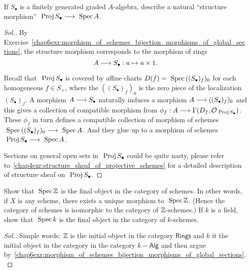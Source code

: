 \documentclass[11pt]{book} %
\begin{document}
\begin{exr}
If $S_\bullet$ is a finitely generated graded $A$-algebra, describe a natural ``structure morphism'' $\text{ Proj\,} S_\bullet\longrightarrow \text{ Spec\,} A$.
\end{exr}
\begin{proof}[Sol.]
By Exercise~\ref{chap6exr:morphism_of_schemes_bijection_morphisms_of_global_sections}, the structure morphism corresponds to the morphism of rings
$$
A\longrightarrow S_\bullet : a\mapsto a\times 1.
$$

Recall that $\text{ Proj\,} S_\bullet$ is covered by  affine charts $D(f)=\text{ Spec\,} ((S_\bullet)_f)_0$ for each homogeneous $f\in S_+$, where the $((S_\bullet)_f)_0$ is the zero piece of the localization $(S_\bullet)_f$. A morphism $A\longrightarrow S_\bullet$ naturally induces a morphism $A\longrightarrow ((S_\bullet)_f)_0$ and this gives a collection of compatible morphism from $\phi_f:A\longrightarrow \Gamma(D_f, {\cal O}_{\text{ Proj\,} S_\bullet})$. These $\phi_f$ in turn defines a compatible collection of morphism of schemes $\text{ Spec\,} ((S_\bullet)_f)_0\longrightarrow \text{ Spec\,} A$. And they glue up to a morphism of schemes $\text{ Proj\,} S_\bullet\longrightarrow \text{ Spec\,} A$.

Sections on general open sets in $\text{ Proj\,} S_\bullet$ could be quite nasty, please refer to~\ref{chap4exr:structure_sheaf_of_projective_schemes} for a detailed description of structure sheaf on $\text{ Proj\,} S_\bullet$.
\end{proof}
\begin{exr}
Show that $\text{ Spec\,} \mathbb Z$ is the final object in the category of schemes. In other words, if $X$ is any scheme, there exists a unique morphism to $\text{ Spec\,} \mathbb Z$. (Hence the category of schemes is isomorphic to the category of $\mathbb Z$-schemes.) If $k$ is a field, show that $\text{ Spec\,} k$ is the final object in the category of $k$-schemes.
\end{exr}
\begin{proof}[Sol.]
Simple words: $\mathbb Z$ is the initial object in the category $\mathsf{Rings}$ and $k$ it the initial object in the category in the category $k-\mathsf{Alg}$ and then argue by~\ref{chap6exr:morphism_of_schemes_bijection_morphisms_of_global_sections}.
\end{proof}
\end{document}

